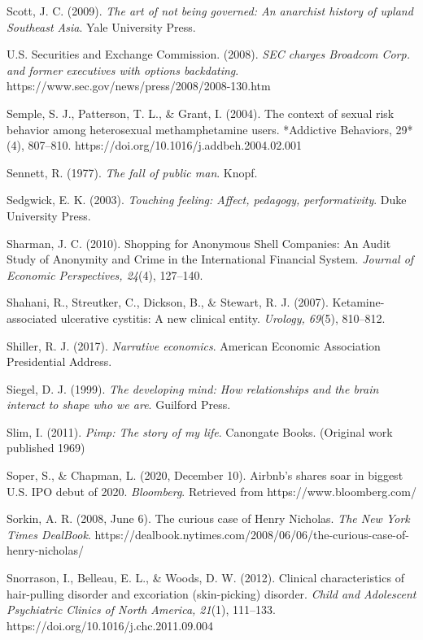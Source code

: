 \begin{thebibliography}{}
    Scott, J. C. (2009). \textit{The art of not being governed: An anarchist history of upland Southeast Asia}. Yale University Press.
    
    U.S. Securities and Exchange Commission. (2008). \textit{SEC charges Broadcom Corp. and former executives with options backdating}. https://www.sec.gov/news/press/2008/2008-130.htm

    Semple, S. J., Patterson, T. L., \& Grant, I. (2004). The context of sexual risk behavior among heterosexual methamphetamine users. *Addictive Behaviors, 29*(4), 807–810. https://doi.org/10.1016/j.addbeh.2004.02.001

    Sennett, R. (1977). \textit{The fall of public man}. Knopf.

    Sedgwick, E. K. (2003). \textit{Touching feeling: Affect, pedagogy, performativity}. Duke University Press.

    Sharman, J. C. (2010). Shopping for Anonymous Shell Companies: An Audit Study of Anonymity and Crime in the International Financial System. \textit{Journal of Economic Perspectives, 24}(4), 127–140.

    Shahani, R., Streutker, C., Dickson, B., \& Stewart, R. J. (2007). Ketamine-associated ulcerative cystitis: A new clinical entity. \textit{Urology, 69}(5), 810–812.

    Shiller, R. J. (2017). \textit{Narrative economics}. American Economic Association Presidential Address.

    Siegel, D. J. (1999). \textit{The developing mind: How relationships and the brain interact to shape who we are}. Guilford Press.

    Slim, I. (2011). \textit{Pimp: The story of my life}. Canongate Books. (Original work published 1969)

    Soper, S., \& Chapman, L. (2020, December 10). Airbnb’s shares soar in biggest U.S. IPO debut of 2020. \textit{Bloomberg}. Retrieved from https://www.bloomberg.com/

    Sorkin, A. R. (2008, June 6). The curious case of Henry Nicholas. \textit{The New York Times DealBook}. https://dealbook.nytimes.com/2008/06/06/the-curious-case-of-henry-nicholas/

    Snorrason, I., Belleau, E. L., \& Woods, D. W. (2012). Clinical characteristics of hair-pulling disorder and excoriation (skin-picking) disorder. \textit{Child and Adolescent Psychiatric Clinics of North America, 21}(1), 111–133. https://doi.org/10.1016/j.chc.2011.09.004


\end{thebibliography}
